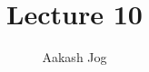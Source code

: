 \documentclass[fleqn, a4paper, 12pt, dev]{article}
\title{Lecture 10}
\author{Aakash Jog}
\date{\formatdate{27}{11}{2014}}
\theoremstyle{definition}
\theoremstyle{theorem}
\begin{document}
\maketitle

\tableofcontents

\newpage
\section{}
\end{document}
